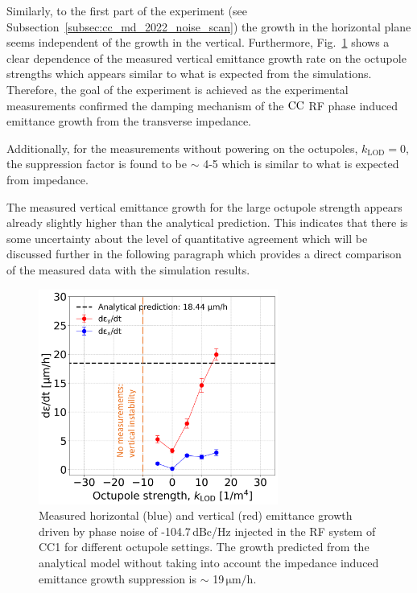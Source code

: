 Similarly, to the first part of the experiment (see Subsection~\ref{subsec:cc_md_2022_noise_scan}) the growth in the horizontal plane seems independent of the growth in the vertical. Furthermore, Fig.~\ref{fig:H_V_emit_growth_background_subtracted_octupole_scan} shows a clear dependence of the measured vertical emittance growth rate on the octupole strengths which appears similar to what is expected from the simulations. Therefore, the goal of the experiment is achieved as the experimental measurements confirmed the damping mechanism of the ${\mathrm{CC}}$ RF phase induced emittance growth from the transverse impedance. 

Additionally, for the measurements without powering on the octupoles, $k_\mathrm{LOD}=0$, the suppression factor is found to be $\sim$ 4-5 which is similar to what is expected from impedance.

The measured vertical emittance growth for the large octupole strength appears already slightly higher than the analytical prediction. This indicates that there is some uncertainty about the level of quantitative agreement which will be discussed further in the following paragraph which provides a direct comparison of the measured data with the simulation results.

\begin{figure}[!h]
   \centering         
   \includegraphics[width=0.7\textwidth]{images/Ch8/emit_H_and_V_octupole_scan_background_growth_subtracted_modified.png}
       \caption{Measured horizontal (blue) and vertical (red) emittance growth driven by phase noise of -104.7\,dBc/Hz injected in the RF system of CC1 for different octupole settings. The growth predicted from the analytical model without taking into account the impedance induced emittance growth suppression is $\sim$ 19\,$\mathrm{\mu m/h}$.}
       \label{fig:H_V_emit_growth_background_subtracted_octupole_scan}
\end{figure}

